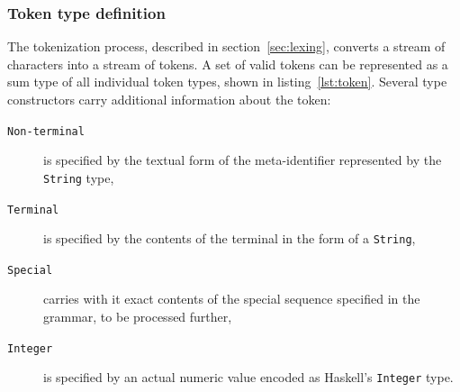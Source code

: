 \documentclass[english,engineering]{wizthesis}
\begin{document}
\subsubsection*{Token type definition}

The tokenization process, described in section~\ref{sec:lexing}, converts a
stream of characters into a stream of tokens. A set of valid tokens can be
represented as a sum type of all individual token types, shown in
listing~\ref{lst:token}. Several type constructors carry additional information
about the token:
\begin{description}
  \item[\texttt{Non-terminal}] is specified by the textual form of the
  meta-identifier represented by the \texttt{String} type,
  \item[\texttt{Terminal}] is specified by the contents of the terminal in the
  form of a \texttt{String},
  \item[\texttt{Special}] carries with it exact contents of the special
  sequence specified in the grammar, to be processed further,
  \item[\texttt{Integer}] is specified by an actual numeric value encoded as
  Haskell's \texttt{Integer} type.
\end{description}



\end{document}

